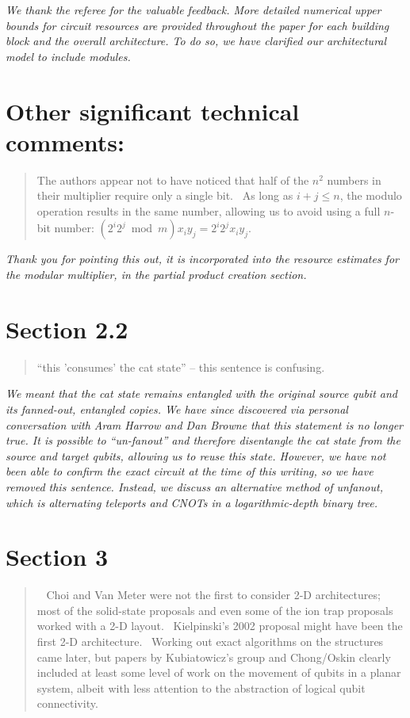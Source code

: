 \documentclass{article}
\theoremstyle{plain} \newtheorem{lemma}{Lemma}
\begin{document}
{\it We thank the referee for the valuable feedback. More detailed numerical
upper bounds for circuit resources are provided throughout the paper for each
building block and the overall architecture. To do so, we have clarified our architectural
model to include modules.}

\section{Other significant technical comments:}

\begin{quote}
The authors appear not to have noticed that half of the $n^2$ numbers in
their multiplier require only a single bit.  As long as $i+j \le n$, the
modulo operation results in the same number, allowing us to avoid
using a full $n$-bit number: $(2^i 2^j \bmod m) x_i y_j = 2^i 2^j x_i y_j$.
\end{quote}

{\it Thank you for pointing this out, it is incorporated into the resource estimates for
the modular multiplier, in the partial product creation section.}

\section{Section 2.2}

\begin{quote}
``this 'consumes' the cat state'' -- this sentence is confusing.
\end{quote}

{\it We meant that the cat state remains entangled with the original source
qubit and its fanned-out, entangled copies. We have since discovered
via personal conversation with Aram Harrow and Dan Browne that this
statement is no longer true. It is possible to ``un-fanout'' and therefore
disentangle the cat state from the source and target qubits, allowing us
to reuse this state.  However, we have not been able to confirm the
exact circuit at the time of this writing, so we have removed this sentence.
Instead, we discuss an alternative method of unfanout, which is alternating
teleports and CNOTs in a logarithmic-depth binary tree.}

\section{Section 3}

\begin{quote}
  Choi and Van Meter were not the first to consider 2-D architectures;
most of the solid-state proposals and even some of the ion trap
proposals worked with a 2-D layout.  Kielpinski's 2002 proposal might
have been the first 2-D architecture.  Working out exact algorithms on
the structures came later, but papers by Kubiatowicz's group and
Chong/Oskin clearly included at least some level of work on the
movement of qubits in a planar system, albeit with less attention to
the abstraction of logical qubit connectivity.
\end{quote}
\end{document}
